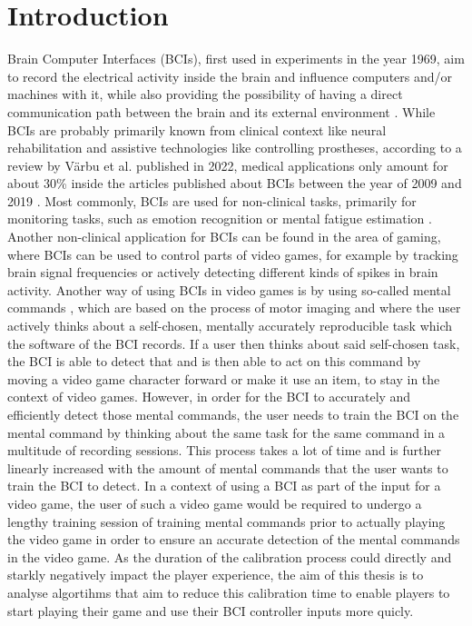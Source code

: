 %
\chapter{Introduction}
\label{chap:introduction}

Brain Computer Interfaces (BCIs), first used in experiments in the year 1969, aim to record the electrical activity inside the brain and influence computers and/or machines with it, while also providing the possibility of having a direct communication path between the brain and its external environment \cite{kawala-sterniuk-2021}.
While BCIs are probably primarily known from clinical context like neural rehabilitation and assistive technologies like controlling prostheses, according to a review by Värbu et al. published in 2022, medical applications only amount for about 30\% inside the articles published about BCIs between the year of 2009 and 2019 \cite{varbu-2022}. Most commonly, BCIs are used for non-clinical tasks, primarily for monitoring tasks, such as emotion recognition \cite{yang2018continuous} or mental fatigue estimation \cite{tian2018mental}.
Another non-clinical application for BCIs can be found in the area of gaming, where BCIs can be used to control parts of video games, for example by tracking brain signal frequencies or actively detecting different kinds of spikes in brain activity. 
Another way of using BCIs in video games is by using so-called \grqq mental commands\grqq %
, which are based on the process of motor imaging and where the user actively thinks about a self-chosen, mentally accurately reproducible task which the software of the BCI records. If a user then thinks about said self-chosen task, the BCI is able to detect that and is then able to act on this command by moving a video game character forward or make it use an item, to stay in the context of video games. 
However, in order for the BCI to accurately and efficiently detect those mental commands, the user needs to train the BCI on the mental command by thinking about the same task for the same command in a multitude of recording sessions. %
This process takes a lot of time and is further linearly increased with the amount of mental commands that the user wants to train the BCI to detect. In a context of using a BCI as part of the input for a video game, the user of such a video game would be required to undergo a lengthy training session of training mental commands prior to actually playing the video game in order to ensure an accurate detection of the mental commands in the video game. As the duration of the calibration process could directly and starkly negatively impact the player experience, the aim of this thesis is to analyse algortihms that aim to reduce this calibration time to enable players to start playing their game and use their BCI controller inputs more quicly. %

